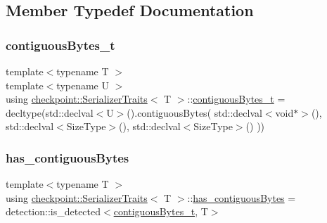 \subsection{Member Typedef Documentation}
\mbox{\label{structcheckpoint_1_1_serializer_traits_aaa8510ef21bb5aac75f50f8038091b86}} 
\subsubsection{\texorpdfstring{contiguous\+Bytes\+\_\+t}{contiguousBytes\_t}}
{\footnotesize\ttfamily template$<$typename T $>$ \\
template$<$typename U $>$ \\
using \hyperlink{structcheckpoint_1_1_serializer_traits}{checkpoint\+::\+Serializer\+Traits}$<$ T $>$\+::\hyperlink{structcheckpoint_1_1_serializer_traits_aaa8510ef21bb5aac75f50f8038091b86}{contiguous\+Bytes\+\_\+t} =  decltype(std\+::declval$<$U$>$().contiguous\+Bytes( std\+::declval$<$void$\ast$$>$(), std\+::declval$<$Size\+Type$>$(), std\+::declval$<$Size\+Type$>$() ))}

\mbox{\label{structcheckpoint_1_1_serializer_traits_aee3349b1b0e4064b7f3a0baf29580835}} 
\subsubsection{\texorpdfstring{has\+\_\+contiguous\+Bytes}{has\_contiguousBytes}}
{\footnotesize\ttfamily template$<$typename T $>$ \\
using \hyperlink{structcheckpoint_1_1_serializer_traits}{checkpoint\+::\+Serializer\+Traits}$<$ T $>$\+::\hyperlink{structcheckpoint_1_1_serializer_traits_aee3349b1b0e4064b7f3a0baf29580835}{has\+\_\+contiguous\+Bytes} =  detection\+::is\+\_\+detected$<$\hyperlink{structcheckpoint_1_1_serializer_traits_aaa8510ef21bb5aac75f50f8038091b86}{contiguous\+Bytes\+\_\+t}, T$>$}

